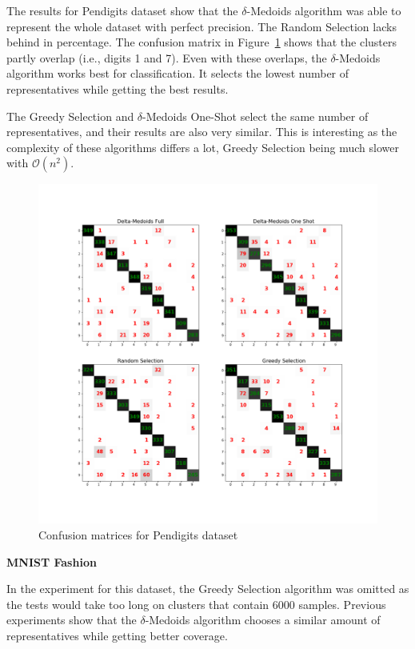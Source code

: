 \documentclass[thesis=B,english]{FITthesis}[2012/10/20]
\begin{document}
\noindent The results for Pendigits dataset show that the $\delta$-Medoids algorithm was able to represent the whole dataset with perfect precision.
The Random Selection lacks behind in percentage.
The confusion matrix in Figure~\ref{img:exp3_pendigits} shows that the clusters partly overlap (i.e., digits 1 and 7).
Even with these overlaps, the $\delta$-Medoids algorithm works best for classification.
It selects the lowest number of representatives while getting the best results.

The Greedy Selection and $\delta$-Medoids One-Shot select the same number of representatives, and their results are also very similar.
This is interesting as the complexity of these algorithms differs a lot, Greedy Selection being much slower with $\mathcal{O}(n^2)$.
\medskip
\begin{figure}[t]
   \includegraphics[width=\linewidth]{img/exp3_pendigits.png}
  \caption{Confusion matrices for Pendigits dataset}
  \label{img:exp3_pendigits}
\end{figure} 

\textbf{MNIST Fashion}

In the experiment for this dataset, the Greedy Selection algorithm was omitted as the tests would take too long on clusters that contain 6000 samples.
Previous experiments show that the $\delta$-Medoids algorithm chooses a similar amount of representatives while getting better coverage.
\end{document}
